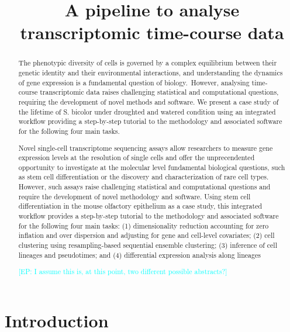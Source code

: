 \documentclass[11 pts]{article}
\makeatletter
\newcommand{\ep}[1]{\textcolor{cyan}{[EP\@: #1]}}
\makeatother
\begin{document}
\title{A pipeline to analyse transcriptomic time-course data}
\maketitle


\begin{abstract}

The phenotypic diversity of cells is governed by a complex equilibrium between
their genetic identity and their environmental interactions, and understanding
the dynamics of gene expression is a fundamental question of biology. However,
analysing time-course transcriptomic data raises challenging statistical and
computational questions, requiring the development of novel methods and
software. We present a case study of the lifetime of S. bicolor under
droughted and watered condition using an integrated workflow providing a
step-by-step tutorial to the methodology and associated software for the
following four main tasks.

Novel single-cell transcriptome sequencing assays allow researchers to measure
gene expression levels at the resolution of single cells and offer the
unprecendented opportunity to investigate at the molecular level fundamental
biological questions, such as stem cell differentiation or the discovery and
characterization of rare cell types. However, such assays raise challenging
statistical and computational questions and require the development of novel
methodology and software. Using stem cell differentiation in the mouse
olfactory epithelium as a case study, this integrated workflow provides a
step-by-step tutorial to the methodology and associated software for the
following four main tasks: (1) dimensionality reduction accounting for zero
inflation and over dispersion and adjusting for gene and cell-level
covariates; (2) cell clustering using resampling-based sequential ensemble
clustering; (3) inference of cell lineages and pseudotimes; and (4)
differential expression analysis along lineages

\ep{I assume this is, at this point, two different possible abstracts?}
\end{abstract}


\section{Introduction}
\end{document}

